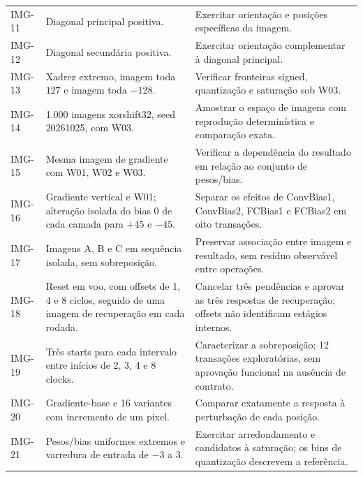 \begin{longtable}{p{1.5cm}p{10.8cm}p{10.8cm}}
IMG-11 & Diagonal principal positiva. & Exercitar orientação e posições específicas da imagem.\\
IMG-12 & Diagonal secundária positiva. & Exercitar orientação complementar à diagonal principal.\\
IMG-13 & Xadrez extremo, imagem toda $127$ e imagem toda $-128$. & Verificar fronteiras signed, quantização e saturação sob W03.\\
IMG-14 & 1.000 imagens xorshift32, seed 20261025, com W03. & Amostrar o espaço de imagens com reprodução determinística e comparação exata.\\
IMG-15 & Mesma imagem de gradiente com W01, W02 e W03. & Verificar a dependência do resultado em relação ao conjunto de pesos/bias.\\
IMG-16 & Gradiente vertical e W01; alteração isolada do bias 0 de cada camada para $+45$ e $-45$. & Separar os efeitos de ConvBias1, ConvBias2, FCBias1 e FCBias2 em oito transações.\\
IMG-17 & Imagens A, B e C em sequência isolada, sem sobreposição. & Preservar associação entre imagem e resultado, sem resíduo observável entre operações.\\
IMG-18 & Reset em voo, com offsets de 1, 4 e 8 ciclos, seguido de uma imagem de recuperação em cada rodada. & Cancelar três pendências e aprovar as três respostas de recuperação; offsets não identificam estágios internos.\\
IMG-19 & Três starts para cada intervalo entre inícios de 2, 3, 4 e 8 clocks. & Caracterizar a sobreposição; 12 transações exploratórias, sem aprovação funcional na ausência de contrato.\\
IMG-20 & Gradiente-base e 16 variantes com incremento de um pixel. & Comparar exatamente a resposta à perturbação de cada posição.\\
IMG-21 & Pesos/bias uniformes extremos e varredura de entrada de $-3$ a $3$. & Exercitar arredondamento e candidatos à saturação; os bins de quantização descrevem a referência.\\
\bottomrule
\end{longtable}
\normalsize

